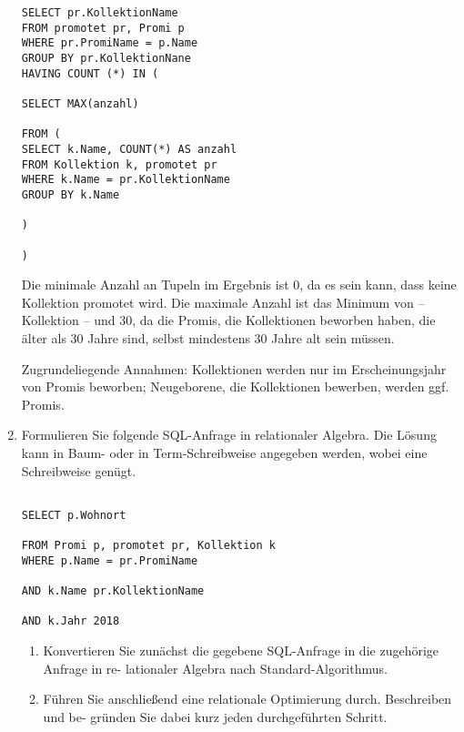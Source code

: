 \documentclass{lehramt-informatik-aufgabe}
\begin{document}
\begin{enumerate}
\begin{verbatim}
SELECT pr.KollektionName
FROM promotet pr, Promi p
WHERE pr.PromiName = p.Name
GROUP BY pr.KollektionNane
HAVING COUNT (*) IN (

SELECT MAX(anzahl)

FROM (
SELECT k.Name, COUNT(*) AS anzahl
FROM Kollektion k, promotet pr
WHERE k.Name = pr.KollektionName
GROUP BY k.Name

)

)
\end{verbatim}

\begin{liAntwort}
Die minimale Anzahl an Tupeln im Ergebnis ist 0, da es sein kann, dass
keine Kollektion promotet wird. Die maximale Anzahl ist das Minimum von
-- Kollektion -- und 30, da die Promis, die Kollektionen beworben haben,
die älter als 30 Jahre sind, selbst mindestens 30 Jahre alt sein müssen.

Zugrundeliegende Annahmen: Kollektionen werden nur im Erscheinungsjahr
von Promis beworben; Neugeborene, die Kollektionen bewerben, werden ggf.
Promis.
\end{liAntwort}


\item Formulieren Sie folgende SQL-Anfrage in relationaler Algebra. Die
Lösung kann in Baum- oder in Term-Schreibweise angegeben werden, wobei
eine Schreibweise genügt.

\begin{verbatim}

SELECT p.Wohnort

FROM Promi p, promotet pr, Kollektion k
WHERE p.Name = pr.PromiName

AND k.Name pr.KollektionName

AND k.Jahr 2018
\end{verbatim}

\begin{enumerate}


\item Konvertieren Sie zunächst die gegebene SQL-Anfrage in die
zugehörige Anfrage in re- lationaler Algebra nach Standard-Algorithmus.


\item Führen Sie anschließend eine relationale Optimierung durch.
Beschreiben und be- gründen Sie dabei kurz jeden durchgeführten Schritt.

\end{enumerate}
\end{enumerate}
\end{document}
